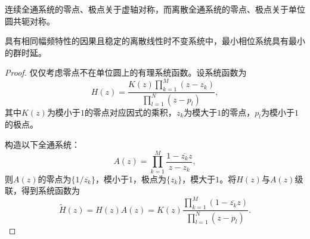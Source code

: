 连续全通系统的零点、极点关于虚轴对称，而离散全通系统的零点、极点关于单位圆共轭对称。

\begin{proposition}
    具有相同幅频特性的因果且稳定的离散线性时不变系统中，最小相位系统具有最小的群时延。
\end{proposition}
\begin{proof}
    仅仅考虑零点不在单位圆上的有理系统函数。设系统函数为
    \begin{equation}
        H(z)=\frac{K(z)\prod_{k=1}^{M}(z-z_k)}{\prod_{l=1}^{N}(z-p_l)},
    \end{equation}
    其中$K(z)$为模小于$1$的零点对应因式的乘积，$z_k$为模大于$1$的零点，$p_l$为模小于$1$的极点。

    构造以下全通系统：
    \begin{equation}
        A(z)=\prod_{k=1}^{M}\frac{1-\overline{z_k} z}{z-z_k},
    \end{equation}
    则$A(z)$的零点为$\{1/\overline{z_k}\}$，模小于$1$，极点为$\{z_k\}$，模大于$1$。将$H(z)$与$A(z)$级联，得到系统函数为
    \begin{equation}
        \tilde{H}(z)=H(z)A(z)=K(z)\frac{\prod_{k=1}^{M}(1-\overline{z_k} z)}{\prod_{l=1}^{N}(z-p_l)}.
    \end{equation}


\end{proof}
